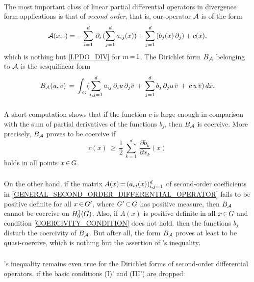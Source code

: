 \documentclass[11pt,twoside]{article}
\begin{document}
\paragraph{} %
The most important class of linear partial differential operators
in divergence form {\wrt} applications is that of \textit{second order},
that is,
our operator ${\mathcal{A}}$ is of the form
\begin{equation}\label{GENERAL_SECOND_ORDER_DIFFERENTIAL_OPERATOR}
{\mathcal{A}}(x,\cdot) = 
-\sum_{i=1}^d \,
\partial_i \, (\sum_{j=1}^d a_{ij}(x)) 
+
\sum_{j=1}^d \, (b_j(x) \, \partial_j)
+
c(x),
\end{equation}
which is nothing but \eqref{LPDO_DIV} for $m {\,=\,} 1$.
The Dirichlet form $B_{{\mathcal{A}}}$ belonging to ${\mathcal{A}}$ is the sesquilinear form
\[
B_{{\mathcal{A}}}(u,v) \,=\, \int_{\,G} 
(\sum_{i,j=1}^d a_{ij} \, \partial_i u \, \partial_j \overline{v} \,+\, 
 \sum_{j=1}^d b_j \, \partial_j u \, \overline{v} \,+\,
 c \,u \, \overline{v}
)
\, dx.
\]

\subparagraph{} %
A short computation shows
that if the function $c$ is large enough in comparison
with the sum of partial derivatives of the functions $b_j$,
then $B_{{\mathcal{A}}}$ is coercive.
More precisely,
$B_{{\mathcal{A}}}$ proves to be coercive if
\begin{equation}\label{COERCIVITY_CONDITION}
c(x) \, \geq \, \frac{1}{2} \,
\sum_{k=1}^d \, \frac{\partial b_k}{\partial x_k}(x)
\end{equation}
holds in all points $x {\,\in\,} G$.

\subparagraph{}
On the other hand,
if the matrix $A(x) {\,=\,} (a_{ij}(x))_{i,j=1}^d$ of second-order coefficients
in \eqref{GENERAL_SECOND_ORDER_DIFFERENTIAL_OPERATOR}
fails to be positive definite for all $x {\,\in\,} G'$,
where $G' {\,\subset\,} G$ has positive measure,
then $B_{{\mathcal{A}}}$ cannot be coercive on $H_0^{1}(G)$.
Also,
if $A(x)$ is positive definite in all $x {\,\in\,} G$
and condition \eqref{COERCIVITY_CONDITION} does not hold.
then the functions $b_j$ disturb the coercivity of $B_{{\mathcal{A}}}$.
But after all,
the form $B_{{\mathcal{A}}}$ proves at least to be quasi-coercive,
which is nothing but the assertion of \textsc{\GARDING}'s inequality.

\subparagraph{} %
\textsc{\GARDING}'s inequality remains even true
for the Dirichlet forms of second-order differential operators,
if the basic conditions (I)' and (III') are dropped:
\end{document}
